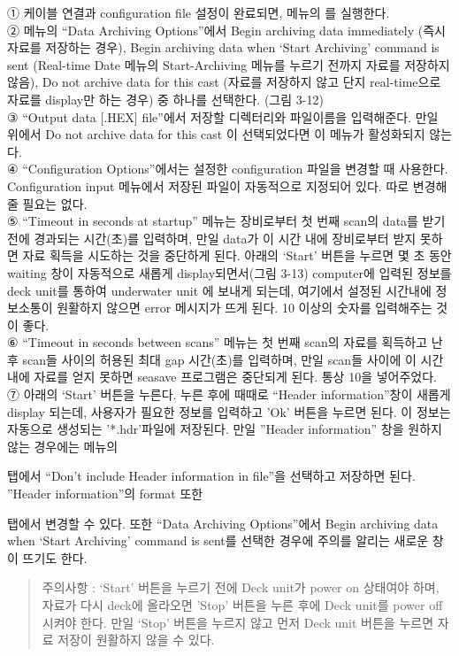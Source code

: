 \documentclass[
]{book}
\begin{document}
① 케이블 연결과 configuration file 설정이 완료되면, 메뉴의 를 실행한다.\\
② 메뉴의 ``Data Archiving Options''에서 Begin archiving data immediately (즉시 자료를 저장하는 경우), Begin archiving data when `Start Archiving' command is sent (Real-time Date 메뉴의 Start-Archiving 메뉴를 누르기 전까지 자료를 저장하지 않음), Do not archive data for this cast (자료를 저장하지 않고 단지 real-time으로 자료를 display만 하는 경우) 중 하나를 선택한다. (그림 3-12)\\
③ ``Output data {[}.HEX{]} file''에서 저장할 디렉터리와 파일이름을 입력해준다. 만일 위에서 Do not archive data for this cast 이 선택되었다면 이 메뉴가 활성화되지 않는다.\\
④ ``Configuration Options''에서는 설정한 configuration 파일을 변경할 때 사용한다. Configuration input 메뉴에서 저장된 파일이 자동적으로 지정되어 있다. 따로 변경해줄 필요는 없다.\\
⑤ ``Timeout in seconds at startup'' 메뉴는 장비로부터 첫 번째 scan의 data를 받기전에 경과되는 시간(초)를 입력하며, 만일 data가 이 시간 내에 장비로부터 받지 못하면 자료 획득을 시도하는 것을 중단하게 된다. 아래의 `Start' 버튼을 누르면 몇 초 동안 waiting 창이 자동적으로 새롭게 display되면서(그림 3-13) computer에 입력된 정보를 deck unit를 통하여 underwater unit 에 보내게 되는데, 여기에서 설정된 시간내에 정보소통이 원활하지 않으면 error 메시지가 뜨게 된다. 10 이상의 숫자를 입력해주는 것이 좋다.\\
⑥ ``Timeout in seconds between scans'' 메뉴는 첫 번째 scan의 자료를 획득하고 난 후 scan들 사이의 허용된 최대 gap 시간(초)를 입력하며, 만일 scan들 사이에 이 시간 내에 자료를 얻지 못하면 seasave 프로그램은 중단되게 된다. 통상 10을 넣어주었다.\\
⑦ 아래의 `Start' 버튼을 누른다. 누른 후에 때때로 ``Header information''창이 새롭게 display 되는데, 사용자가 필요한 정보를 입력하고 'Ok' 버튼을 누르면 된다. 이 정보는 자동으로 생성되는 '*.hdr'파일에 저장된다. 만일 ''Header information'' 창을 원하지 않는 경우에는 메뉴의

탭에서 ``Don't include Header information in file''을 선택하고 저장하면 된다. ''Header information''의 format 또한

탭에서 변경할 수 있다. 또한 ``Data Archiving Options''에서 Begin archiving data when `Start Archiving' command is sent를 선택한 경우에 주의를 알리는 새로운 창이 뜨기도 한다.

\begin{quote}
주의사항 : `Start' 버튼을 누르기 전에 Deck unit가 power on 상태여야 하며, 자료가 다시 deck에 올라오면 'Stop' 버튼을 누른 후에 Deck unit를 power off 시켜야 한다. 만일 `Stop' 버튼을 누르지 않고 먼저 Deck unit 버튼을 누르면 자료 저장이 원활하지 않을 수 있다.
\end{quote}
\end{document}
